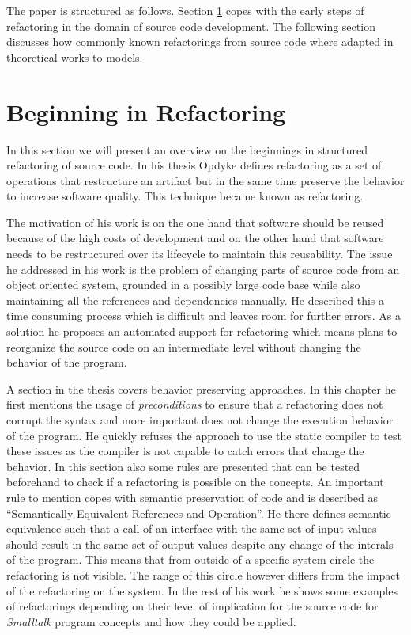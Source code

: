 \documentclass{llncs}
\begin{document}
The paper is structured as follows. Section \ref{sec:beginning} copes with the early steps of refactoring in the domain
of source code development. The following section discusses how commonly known refactorings from source code where
adapted in theoretical works to models.

\section{Beginning in Refactoring}
\label{sec:beginning}

In this section we will present an overview on the beginnings in structured refactoring of source code. In his thesis
\cite{mast:REFOOF} Opdyke defines refactoring as a set of operations that restructure an artifact but in the same time
preserve the behavior to increase software quality. This technique became known as refactoring.

The motivation of his work is on the one hand that software should be reused because of the high costs of development
and on the other hand that software needs to be restructured over its lifecycle to maintain this reusability. The issue
he addressed in his work is the problem of changing parts of source code from an object oriented system, grounded in a
possibly large code base while also maintaining all the references and dependencies manually. He described this a time
consuming process which is difficult and leaves room for further errors. As a solution he proposes an automated support
for refactoring which means plans to reorganize the source code on an intermediate level without changing the behavior
of the program.

A section in the thesis covers behavior preserving approaches. In this chapter he first mentions the usage of
\textit{preconditions} to ensure that a refactoring does not corrupt the syntax and more important does not change the
execution behavior of the program. He quickly refuses the approach to use the static compiler to test these issues as
the compiler is not capable to catch errors that change the behavior. In this section also some rules are presented that
can be tested beforehand to check if a refactoring is possible on the concepts. An important rule to mention copes with
semantic preservation of code and is described as ``Semantically Equivalent References and Operation''. He there defines
semantic equivalence such that a call of an interface with the same set of input values should result in the same set of
output values despite any change of the interals of the program. This means that from outside of a specific system
circle the refactoring is not visible. The range of this circle however differs from the impact of the refactoring on
the system. In the rest of his work he shows some examples of refactorings depending on their level of implication for
the source code for \textit{Smalltalk} program concepts and how they could be applied.
\end{document}

